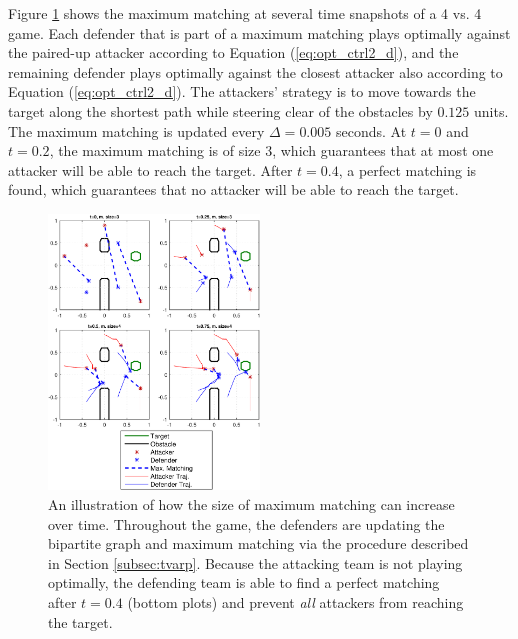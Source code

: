 Figure \ref{fig:real_time_update} shows the maximum matching at several time snapshots of a 4 vs. 4 game. Each defender that is part of a maximum matching plays optimally against the paired-up attacker according to Equation (\ref{eq:opt_ctrl2_d}), and the remaining defender plays optimally against the closest attacker also according to Equation (\ref{eq:opt_ctrl2_d}). The attackers' strategy is to move towards the target along the shortest path while steering clear of the obstacles by $0.125$ units. The maximum matching is updated every $\Delta=0.005$ seconds. At $t=0$ and $t=0.2$, the maximum matching is of size 3, which guarantees that at most one attacker will be able to reach the target. After $t=0.4$, a perfect matching is found, which guarantees that no attacker will be able to reach the target.

\begin{figure}
	\centering
	\includegraphics[width=0.5\textwidth]{"fig/time varying graph"}
	\caption{An illustration of how the size of maximum matching can increase over time. Throughout the game, the defenders are updating the bipartite graph and maximum matching via the procedure described in Section \ref{subsec:tvarp}. Because the attacking team is not playing optimally, the defending team is able to find a perfect matching after $t=0.4$ (bottom plots) and prevent \textit{all} attackers from reaching the target.}
	\label{fig:real_time_update}
\end{figure}
